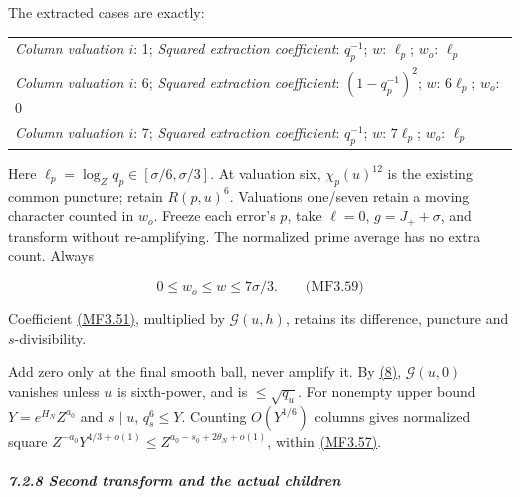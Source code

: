 The extracted cases are exactly:

\begingroup\small
\begin{longtable}{@{}p{\linewidth}@{}}
\toprule
\endhead
\bottomrule
\endlastfoot
\textit{Column valuation \(i\)}: 1; \enspace \textit{Squared extraction coefficient}: \(q_p^{-1}\); \enspace \textit{\(w\)}: \(\ell_p\); \enspace \textit{\(w_o\)}: \(\ell_p\) \\
\addlinespace[3pt]
\textit{Column valuation \(i\)}: 6; \enspace \textit{Squared extraction coefficient}: \((1-q_p^{-1})^2\); \enspace \textit{\(w\)}: \(6\ell_p\); \enspace \textit{\(w_o\)}: 0 \\
\addlinespace[3pt]
\textit{Column valuation \(i\)}: 7; \enspace \textit{Squared extraction coefficient}: \(q_p^{-1}\); \enspace \textit{\(w\)}: \(7\ell_p\); \enspace \textit{\(w_o\)}: \(\ell_p\) \\
\end{longtable}
\endgroup

Here \(\ell_p=\log_Zq_p\in[\sigma/6,\sigma/3]\). At valuation six, \(\chi_p(u)^{12}\) is the existing common puncture; retain \(R(p,u)^6\). Valuations one/seven retain a moving character counted in \(w_o\). Freeze each error's \(p\), take \(\ell=0\), \(g=J_++\sigma\), and transform without re-amplifying. The normalized prime average has no extra count. Always

\hypertarget{mf:eq:B3.59}{}

\label{mf:eq:B3.59}

\[
0\le w_o\le w\le7\sigma/3.
\qquad\text{(MF3.59)}
\]

Coefficient \protect\hyperlink{mf:eq:B3.51}{(MF3.51)}, multiplied by \(\mathcal G(u,h)\), retains its difference, puncture and \(s\)-divisibility.

Add zero only at the final smooth ball, never amplify it. By \protect\hyperlink{cf:eq:A.12}{(8)}, \(\mathcal G(u,0)\) vanishes unless \(u\) is sixth-power, and is \(\le\sqrt{q_u}\). For nonempty upper bound \(Y=e^{H_N}Z^{a_0}\) and \(s\mid u\), \(q_s^6\le Y\). Counting \(O(Y^{1/6})\) columns gives normalized square \(Z^{-a_0}Y^{4/3+o(1)}\le Z^{a_0-s_0+2\theta_N+o(1)}\), within \protect\hyperlink{mf:eq:B3.57}{(MF3.57)}.

\hypertarget{second-transform-and-the-actual-children}{}

\label{second-transform-and-the-actual-children}

\hypertarget{second-transform-and-the-actual-children-heading-2}{%
\subparagraph{7.2.8 Second transform and the actual children}}

